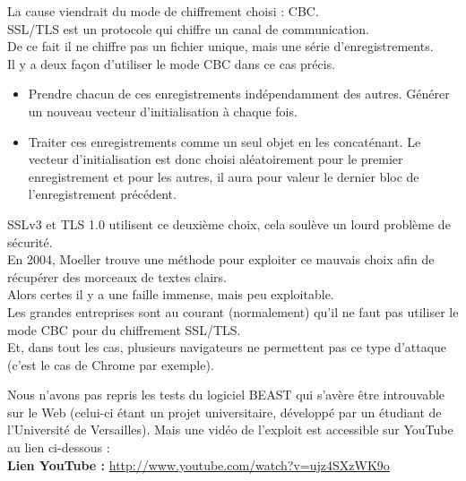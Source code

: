			La cause viendrait du mode de chiffrement choisi : CBC.\\
		
			SSL/TLS est un protocole qui chiffre un canal de communication.\\
			De ce fait il ne chiffre pas un fichier unique, mais une série
			d'enregistrements.\\
			Il y a deux façon d'utiliser le mode CBC dans ce cas précis.
			\begin{itemize}
			\item Prendre chacun de ces enregistrements indépendamment 
			des autres.
			Générer un nouveau vecteur d'initialisation à chaque fois.
			\item Traiter ces enregistrements comme un seul objet en les
			concaténant. Le vecteur d'initialisation est donc choisi
			aléatoirement pour le premier enregistrement et pour les autres, 
			il aura pour valeur le dernier bloc de l'enregistrement précédent.
			\end{itemize}
			
			SSLv3 et TLS 1.0 utilisent ce deuxième choix, cela soulève 
			un lourd problème de sécurité.\\
			
			En 2004, Moeller \cite{moeller2004cbc} trouve 
			une méthode pour exploiter ce mauvais choix
			afin de récupérer des morceaux de textes clairs.\\
			
			Alors certes il y a une faille immense, mais peu exploitable.\\
			Les grandes entreprises sont au courant (normalement) qu'il ne faut
			pas utiliser le mode CBC pour du chiffrement SSL/TLS.\\
			Et, dans tout les cas, plusieurs navigateurs ne permettent pas ce
			type d'attaque (c'est le cas de Chrome par exemple).\\
			
			
			Nous n'avons pas repris les tests du logiciel BEAST qui s'avère
			être introuvable sur le Web (celui-ci étant un projet universitaire,
			développé par un étudiant de l'Université de Versailles).
			Mais une vidéo de l'exploit est accessible sur YouTube au lien
			ci-dessous : \\
			
			\textbf{Lien YouTube : } 
			\href{http://www.youtube.com/watch?v=ujz4SXzWK9o}
			{http://www.youtube.com/watch?v=ujz4SXzWK9o}
		
